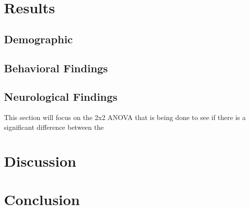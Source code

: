 \documentclass[10pt, twocolumn]{article}
\begin{document}





\section{Results}
\subsection{Demographic}
\subsection{Behavioral Findings}
\subsection{Neurological Findings}
\label{results:fnirs}
This section will focus on the 2x2 ANOVA that is being done to see if there is a significant difference between the 
\section{Discussion}
\section{Conclusion}

\printbibliography %
\end{document}
